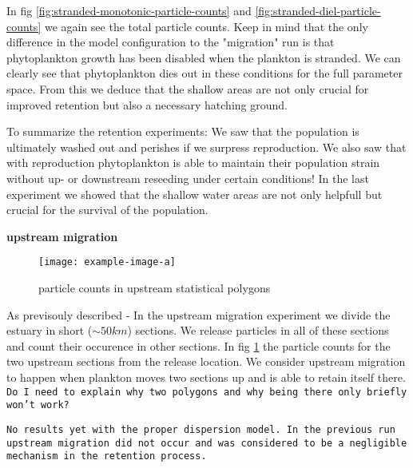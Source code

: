 In fig \ref{fig:stranded-monotonic-particle-counts} and \ref{fig:stranded-diel-particle-counts} we again see the total particle counts.
Keep in mind that the only difference in the model configuration to the "migration" run is that phytoplankton growth has been disabled when the plankton is stranded.
We can clearly see that phytoplankton dies out in these conditions for the full parameter space.
From this we deduce that the shallow areas are not only crucial for improved retention but also a necessary hatching ground.

To summarize the retention experiments: We saw that the population is ultimately washed out and perishes if we surpress reproduction.
We also saw that with reproduction phytoplankton is able to maintain their population strain without up- or downstream reseeding under certain conditions!
In the last experiment we showed that the shallow water areas are not only helpfull but crucial for the survival of the population.

\textbf{upstream migration}
\begin{figure}
    \texttt{[image: example-image-a]}
    \caption[]{particle counts in upstream statistical polygons}
    \label{fig:upstream-migration-statistical-poly-counts}
\end{figure}
As previsouly described - In the upstream migration experiment we divide the estuary in short ($\sim 50km$) sections.
We release particles in all of these sections and count their occurence in other sections.
In fig \ref{fig:upstream-migration-statistical-poly-counts} the particle counts for the two upstream sections from the release location.
We consider upstream migration to happen when plankton moves two sections up and is able to retain itself there.
\texttt{Do I need to explain why two polygons and why being there only briefly won't work?}

\texttt{No results yet with the proper dispersion model. In the previous run upstream migration did not occur and was considered to be a negligible mechanism in the retention process.}



